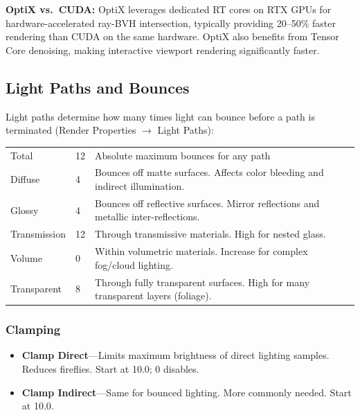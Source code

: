 \textbf{OptiX vs.\ CUDA:} OptiX leverages dedicated RT cores on RTX
GPUs for hardware-accelerated ray-BVH intersection, typically
providing 20--50\% faster rendering than CUDA on the same hardware.
OptiX also benefits from Tensor Core denoising, making interactive
viewport rendering significantly faster.

\subsection{Light Paths and Bounces}
\label{sec:shading:cycles:lightpaths}

Light paths determine how many times light can bounce before a path
is terminated (Render Properties $\rightarrow$ Light Paths):

\begin{center}
\begin{tabularx}{\textwidth}{L{2.5cm}C{1.5cm}X}
\toprule
{}
 &  &  \\
\midrule
Total & 12 & Absolute maximum bounces for any path \\
Diffuse & 4 & Bounces off matte surfaces. Affects color bleeding and indirect illumination. \\
Glossy & 4 & Bounces off reflective surfaces. Mirror reflections and metallic inter-reflections. \\
Transmission & 12 & Through transmissive materials. High for nested glass. \\
Volume & 0 & Within volumetric materials. Increase for complex fog/cloud lighting. \\
Transparent & 8 & Through fully transparent surfaces. High for many transparent layers (foliage). \\
\bottomrule
\end{tabularx}
\end{center}

\subsubsection{Clamping}

\begin{itemize}[leftmargin=2em]
  \item \textbf{Clamp Direct}---Limits maximum brightness of direct
        lighting samples. Reduces fireflies. Start at 10.0; 0 disables.
  \item \textbf{Clamp Indirect}---Same for bounced lighting. More
        commonly needed. Start at 10.0.
\end{itemize}

